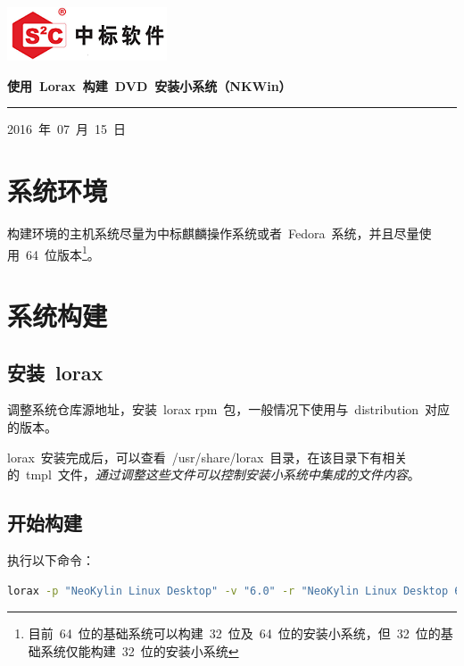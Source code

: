 \documentclass[a4paper]{ctexart}
\begin{document}
\thispagestyle{empty}

\noindent\begin{minipage}{\textwidth}
	\begin{flushleft}
	\includegraphics{logo/cs2c-short-logo}
	\end{flushleft}
\end{minipage}

\noindent\begin{minipage}{\textwidth}
\centering
{\LARGE \bfseries 使用~Lorax~构建~DVD~安装小系统（NKWin）}
\noindent\rule[1.5ex]{\textwidth}{1pt}
\end{minipage}

\noindent\begin{center}
2016~年~07~月~15~日
\end{center}
\clearpage

\section{系统环境}
构建环境的主机系统尽量为中标麒麟操作系统或者~Fedora~系统，并且尽量使用~64~位版本\footnote{目前~64~位的基础系统可以构建~32~位及~64~位的安装小系统，但~32~位的基础系统仅能构建~32~位的安装小系统}。

\section{系统构建}
\subsection{安装~lorax~}
调整系统仓库源地址，安装~lorax rpm~包，一般情况下使用与~distribution~对应的版本。

lorax~安装完成后，可以查看~/usr/share/lorax~目录，在该目录下有相关的~tmpl~文件，\emph{通过调整这些文件可以控制安装小系统中集成的文件内容}。

\subsection{开始构建}
执行以下命令：
\begin{lstlisting}[language=bash]
lorax -p "NeoKylin Linux Desktop" -v "6.0" -r "NeoKylin Linux Desktop 6.0" --isfinal --volid="NeoKylin Linux Desktop 6.0" -s "REPO-URL" DEST-DIR
\end{lstlisting}
\end{document}
